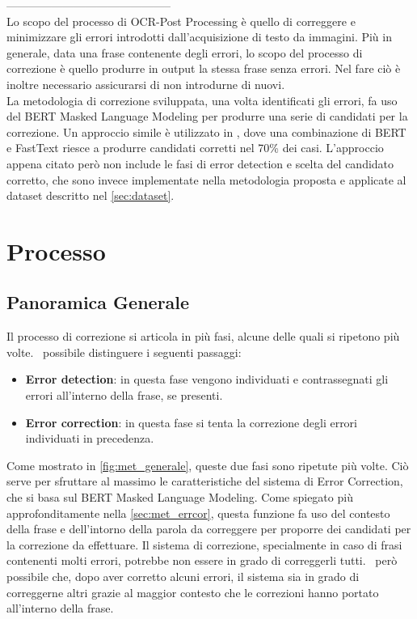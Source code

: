 --------------------------------------------\\
Lo scopo del processo di OCR-Post Processing è quello di correggere e minimizzare gli errori introdotti dall'acquisizione di testo da immagini. Più in generale, data una frase contenente degli errori, lo scopo del processo di correzione è quello produrre in output la stessa frase senza errori. Nel fare ciò è inoltre necessario assicurarsi di non introdurne di nuovi.\\
La metodologia di correzione sviluppata, una volta identificati gli errori, fa uso del BERT Masked Language Modeling per produrre una serie di candidati per la correzione. Un approccio simile è utilizzato in \cite{OCRMaskFilling}, dove una combinazione di BERT e FastText riesce a produrre candidati corretti nel 70\% dei casi. L'approccio appena citato però non include le fasi di error detection e scelta del candidato corretto, che sono invece implementate nella metodologia proposta e applicate al dataset descritto nel \autoref{sec:dataset}.

\section{Processo}
\label{sec:met_processo}

\subsection{Panoramica Generale}
\label{sec:met_panoramica}
Il processo di correzione si articola in più fasi, alcune delle quali si ripetono più volte. \E\ possibile distinguere i seguenti passaggi:
\begin{itemize}
\item \textbf{Error detection}: in questa fase vengono individuati e contrassegnati gli errori all'interno della frase, se presenti.
\item \textbf{Error correction}: in questa fase si tenta la correzione degli errori individuati in precedenza.
\end{itemize}

Come mostrato in \autoref{fig:met_generale}, queste due fasi sono ripetute più volte. Ciò serve per sfruttare al massimo le caratteristiche del sistema di Error Correction, che si basa sul BERT Masked Language Modeling. Come spiegato più approfonditamente nella \autoref{sec:met_errcor}, questa funzione fa uso del contesto della frase e dell'intorno della parola da correggere per proporre dei candidati per la correzione da effettuare.
Il sistema di correzione, specialmente in caso di frasi contenenti molti errori, potrebbe non essere in grado di correggerli tutti. \E\ però possibile che, dopo aver corretto alcuni errori, il sistema sia in grado di correggerne altri grazie al maggior contesto che le correzioni hanno portato all'interno della frase.


